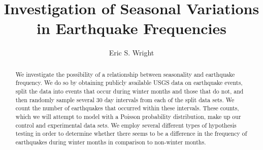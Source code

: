 \documentclass{amsart}
\title{Investigation of Seasonal Variations in Earthquake Frequencies}
\author{Eric S. Wright}
\begin{document}
\begin{abstract}
We investigate the possibility of a relationship between seasonality and earthquake frequency. We do so by obtaining publicly available USGS data on earthquake events, split the data into events that occur during winter months and those that do not, and then randomly sample several 30 day intervals from each of the split data sets. We count the number of earthquakes that occurred within these intervals. These counts, which we will attempt to model with a Poisson probability distribution, make up our control and experimental data sets. We employ several different types of hypothesis testing in order to determine whether there seems to be a difference in the frequency of earthquakes during winter months in comparison to non-winter months. 
\end{abstract}
\maketitle
\end{document}
